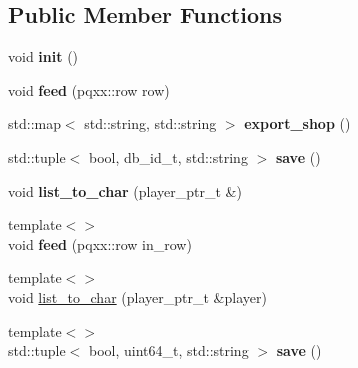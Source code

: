 \subsection*{Public Member Functions}
\begin{DoxyCompactItemize}
\item 
\mbox{\label{structshop__data_a470d2a66b2ab603381f720653ebdf3d6}} 
void {\bfseries init} ()
\item 
\mbox{\label{structshop__data_a8d4ff1696887b5051879d62f7537370b}} 
void {\bfseries feed} (pqxx\+::row row)
\item 
\mbox{\label{structshop__data_aee4ef547f48f79114c7dbebce0364869}} 
std\+::map$<$ std\+::string, std\+::string $>$ {\bfseries export\+\_\+shop} ()
\item 
\mbox{\label{structshop__data_a51c99101db1d502b71cc673659da5f5f}} 
std\+::tuple$<$ bool, db\+\_\+id\+\_\+t, std\+::string $>$ {\bfseries save} ()
\item 
\mbox{\label{structshop__data_a95126b358a781ec10afeefac091daa0c}} 
void {\bfseries list\+\_\+to\+\_\+char} (player\+\_\+ptr\+\_\+t \&)
\item 
\mbox{\label{structshop__data_abd168c07e56d01c8dd87e0ba1a64069a}} 
{\footnotesize template$<$$>$ }\\void {\bfseries feed} (pqxx\+::row in\+\_\+row)
\item 
{\footnotesize template$<$$>$ }\\void \hyperlink{structshop__data_a9eff8b43ae8575c9af49695dd3fa3618}{list\+\_\+to\+\_\+char} (player\+\_\+ptr\+\_\+t \&player)
\item 
\mbox{\label{structshop__data_a368e8704f49db0546668c82bfa645905}} 
{\footnotesize template$<$$>$ }\\std\+::tuple$<$ bool, uint64\+\_\+t, std\+::string $>$ {\bfseries save} ()
\end{DoxyCompactItemize}
